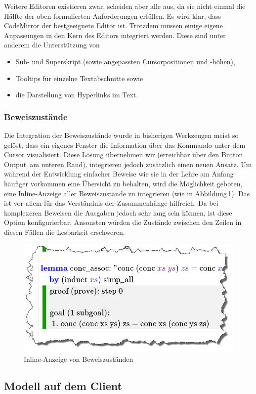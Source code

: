 Weitere Editoren existieren zwar, scheiden aber alle aus, da sie nicht einmal die Hälfte der oben
formulierten Anforderungen erfüllen. Es wird klar, dass CodeMirror der bestgeeignete Editor ist.
Trotzdem müssen einige eigene Anpassungen in den Kern des Editors integriert werden. Diese sind
unter anderem die Unterstützung von

\begin{itemize}
  \item Sub- und Superskript (sowie angepassten Cursorpositionen und -höhen),
  \item Tooltips für einzelne Textabschnitte sowie
  \item die Darstellung von Hyperlinks im Text.
\end{itemize}

\subsubsection{Beweiszustände}

Die Integration der Beweiszustände wurde in bisherigen Werkzeugen meist so gelöst, dass ein eigenes
Fenster die Information über das Kommando unter dem Cursor visualisiert. Diese Lösung übernehmen wir
(erreichbar über den Button \glqq Output\grqq\ am unteren Rand), integrieren jedoch zusätzlich einen
neuen Ansatz. Um während der Entwicklung einfacher Beweise wie sie in der Lehre am Anfang häufiger
vorkommen eine Übersicht zu behalten, wird die Möglichkeit geboten, eine Inline-Anzeige aller
Beweiszustände zu integrieren (wie in Abbildung\,\ref{fig:inline-states}). Das ist vor allem
für das Verständnis der Zusammenhänge hilfreich. Da bei komplexeren Beweisen die Ausgaben jedoch
sehr lang sein können, ist diese Option konfigurierbar. Ansonsten würden die Zustände zwischen den
Zeilen in diesen Fällen die Lesbarkeit erschweren.

\begin{figure}[ht]
\centering
\includegraphics[width=0.5\linewidth]{images/inline-states}
  \caption{Inline-Anzeige von Beweiszuständen}
  \label{fig:inline-states}
\end{figure}

\subsection{Modell auf dem Client}


